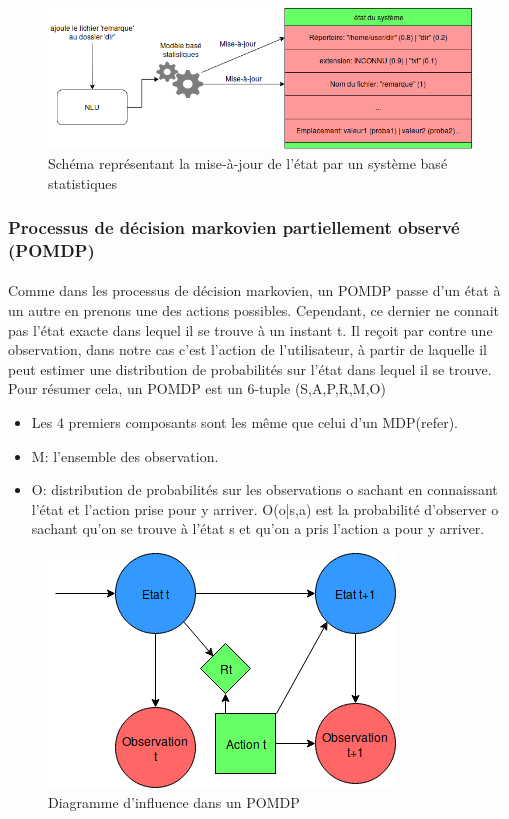\begin{figure}[H]
	\centering
	\includegraphics[width=.7\linewidth]{images/DM/StatBasedUpdate.png} 
	\caption{Schéma représentant la mise-à-jour de l'état par un système basé statistiques} 
\end{figure}

\subsubsection{Processus de décision markovien partiellement observé (POMDP)}
\paragraph{}
Comme dans les processus de décision markovien, un POMDP\cite{Astrom1965} passe d’un état à un autre en prenons une des actions possibles. Cependant, ce dernier ne connait pas l’état exacte dans lequel il se trouve à un instant t. Il reçoit par contre une observation, dans notre cas c’est l’action de l’utilisateur, à partir de laquelle il peut estimer une distribution de probabilités sur l’état dans lequel il se trouve. Pour résumer cela, un POMDP est un 6-tuple (S,A,P,R,M,O)
\begin{itemize}
\item Les 4 premiers composants sont les même que celui d’un MDP(refer).
\item M: l’ensemble des observation.
\item O: distribution de probabilités sur les observations o sachant en connaissant l’état et l’action prise pour y arriver. O(o|s,a) est la probabilité d’observer o sachant qu’on se trouve à l’état s et qu’on a pris l’action a pour y arriver.
\end{itemize}

\begin{figure}[H]
	\centering
	\includegraphics[width=.5\linewidth]{images/DM/POMDP.png} 
	\caption{Diagramme d'influence dans un POMDP} 
\end{figure}

